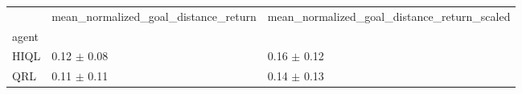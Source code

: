 \begin{tabular}{lll}
\toprule
 & mean_normalized_goal_distance_return & mean_normalized_goal_distance_return_scaled \\
agent &  &  \\
\midrule
HIQL & 0.12 $\pm$ 0.08 & 0.16 $\pm$ 0.12 \\
QRL & 0.11 $\pm$ 0.11 & 0.14 $\pm$ 0.13 \\
\bottomrule
\end{tabular}
